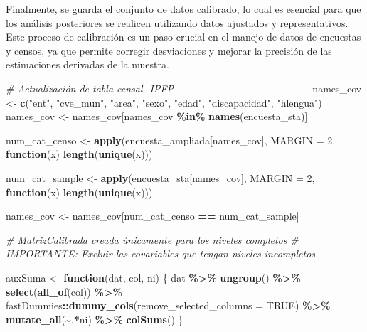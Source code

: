 \documentclass[
  12pt,
]{book}
\newenvironment{Shaded}{\begin{snugshade}}{\end{snugshade}}
\newcommand{\AttributeTok}[1]{\textcolor[rgb]{0.13,0.29,0.53}{#1}}
\newcommand{\CommentTok}[1]{\textcolor[rgb]{0.56,0.35,0.01}{\textit{#1}}}
\newcommand{\ConstantTok}[1]{\textcolor[rgb]{0.56,0.35,0.01}{#1}}
\newcommand{\ControlFlowTok}[1]{\textcolor[rgb]{0.13,0.29,0.53}{\textbf{#1}}}
\newcommand{\DecValTok}[1]{\textcolor[rgb]{0.00,0.00,0.81}{#1}}
\newcommand{\FunctionTok}[1]{\textcolor[rgb]{0.13,0.29,0.53}{\textbf{#1}}}
\newcommand{\NormalTok}[1]{#1}
\newcommand{\OtherTok}[1]{\textcolor[rgb]{0.56,0.35,0.01}{#1}}
\newcommand{\SpecialCharTok}[1]{\textcolor[rgb]{0.81,0.36,0.00}{\textbf{#1}}}
\newcommand{\StringTok}[1]{\textcolor[rgb]{0.31,0.60,0.02}{#1}}
\begin{document}
Finalmente, se guarda el conjunto de datos calibrado, lo cual es esencial para que los análisis posteriores se realicen utilizando datos ajustados y representativos. Este proceso de calibración es un paso crucial en el manejo de datos de encuestas y censos, ya que permite corregir desviaciones y mejorar la precisión de las estimaciones derivadas de la muestra.

\begin{Shaded}
\begin{Highlighting}[]
\CommentTok{\# Actualización de tabla censal{-} IPFP {-}{-}{-}{-}{-}{-}{-}{-}{-}{-}{-}{-}{-}{-}{-}{-}{-}{-}{-}{-}{-}{-}{-}{-}{-}{-}{-}{-}{-}{-}{-}{-}{-}{-}{-}{-}{-}}
\NormalTok{names\_cov }\OtherTok{\textless{}{-}} \FunctionTok{c}\NormalTok{(}\StringTok{"ent"}\NormalTok{, }\StringTok{"cve\_mun"}\NormalTok{, }\StringTok{"area"}\NormalTok{, }\StringTok{"sexo"}\NormalTok{, }\StringTok{"edad"}\NormalTok{, }\StringTok{"discapacidad"}\NormalTok{, }\StringTok{"hlengua"}\NormalTok{)}
\NormalTok{names\_cov }\OtherTok{\textless{}{-}}\NormalTok{ names\_cov[names\_cov }\SpecialCharTok{\%in\%} \FunctionTok{names}\NormalTok{(encuesta\_sta)]}

\NormalTok{num\_cat\_censo }\OtherTok{\textless{}{-}} \FunctionTok{apply}\NormalTok{(encuesta\_ampliada[names\_cov], }\AttributeTok{MARGIN  =} \DecValTok{2}\NormalTok{, }\ControlFlowTok{function}\NormalTok{(x)}
  \FunctionTok{length}\NormalTok{(}\FunctionTok{unique}\NormalTok{(x)))}

\NormalTok{num\_cat\_sample }\OtherTok{\textless{}{-}} \FunctionTok{apply}\NormalTok{(encuesta\_sta[names\_cov], }\AttributeTok{MARGIN  =} \DecValTok{2}\NormalTok{, }\ControlFlowTok{function}\NormalTok{(x)}
  \FunctionTok{length}\NormalTok{(}\FunctionTok{unique}\NormalTok{(x)))}

\NormalTok{names\_cov }\OtherTok{\textless{}{-}}\NormalTok{ names\_cov[num\_cat\_censo }\SpecialCharTok{==}\NormalTok{ num\_cat\_sample]}

\CommentTok{\# MatrizCalibrada creada únicamente para los niveles completos }
\CommentTok{\# IMPORTANTE: Excluir las covariables que tengan niveles incompletos}

\NormalTok{auxSuma }\OtherTok{\textless{}{-}} \ControlFlowTok{function}\NormalTok{(dat, col, ni) \{}
\NormalTok{  dat }\SpecialCharTok{\%\textgreater{}\%} \FunctionTok{ungroup}\NormalTok{() }\SpecialCharTok{\%\textgreater{}\%} \FunctionTok{select}\NormalTok{(}\FunctionTok{all\_of}\NormalTok{(col))  }\SpecialCharTok{\%\textgreater{}\%}
\NormalTok{    fastDummies}\SpecialCharTok{::}\FunctionTok{dummy\_cols}\NormalTok{(}\AttributeTok{remove\_selected\_columns =} \ConstantTok{TRUE}\NormalTok{) }\SpecialCharTok{\%\textgreater{}\%} 
    \FunctionTok{mutate\_all}\NormalTok{(}\SpecialCharTok{\textasciitilde{}}\NormalTok{.}\SpecialCharTok{*}\NormalTok{ni) }\SpecialCharTok{\%\textgreater{}\%} \FunctionTok{colSums}\NormalTok{()  }
\NormalTok{\}}


\end{Highlighting}
\end{Shaded}
\end{document}
